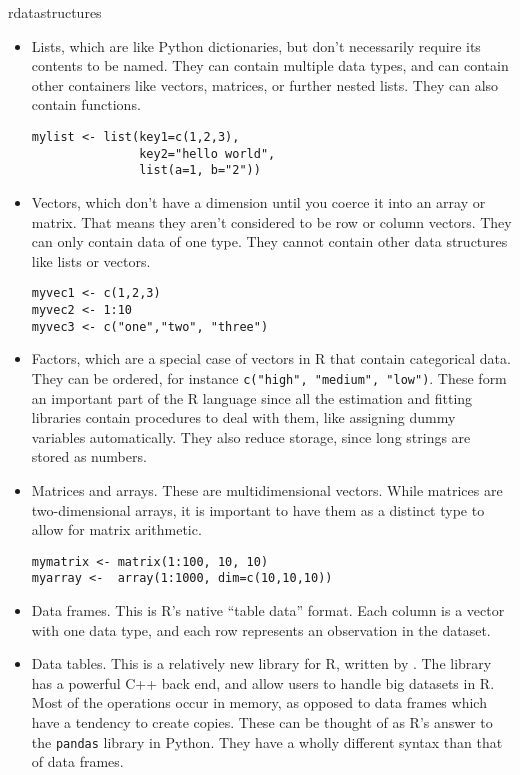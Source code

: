 \begin{answer}{rdatastructures}
\begin{itemize}
  \item Lists, which are like Python dictionaries, but don't necessarily require its contents to be named.
  They can contain multiple data types, and can contain other containers like vectors, matrices, or further nested lists.
  They can also contain functions.
  \begin{verbatim}
mylist <- list(key1=c(1,2,3),
               key2="hello world",
               list(a=1, b="2"))
  \end{verbatim}
  \item Vectors, which don't have a dimension until you coerce it into an array or matrix.
  That means they aren't considered to be row or column vectors.
  They can only contain data of one type.
  They cannot contain other data structures like lists or vectors.
  \begin{verbatim}
myvec1 <- c(1,2,3)
myvec2 <- 1:10
myvec3 <- c("one","two", "three")
  \end{verbatim}
  \item
  Factors, which are a special case of vectors in R that contain categorical data.
  They can be ordered, for instance \verb+c("high", "medium", "low")+.
  These form an important part of the R language since all the estimation and fitting libraries contain procedures to deal with them, like assigning dummy variables automatically.
  They also reduce storage, since long strings are stored as numbers.
  \item Matrices and arrays.
  These are multidimensional vectors.
  While matrices are two-dimensional arrays, it is important to have them as a distinct type to allow for matrix arithmetic.
  \begin{verbatim}
mymatrix <- matrix(1:100, 10, 10)
myarray <-  array(1:1000, dim=c(10,10,10))
  \end{verbatim}
  \item Data frames. This is R's native ``table data'' format.
  Each column is a vector with one data type, and each row represents an observation in the dataset.
  \item Data tables. This is a relatively new library for R, written by \citet{datatables}.
  The library has a powerful C++ back end, and allow users to handle big datasets in R.
  Most of the operations occur in memory, as opposed to data frames which have a tendency to create copies.
  These can be thought of as R's answer to the \verb+pandas+ library in Python.
  They have a wholly different syntax than that of data frames.
\end{itemize}
\end{answer}

